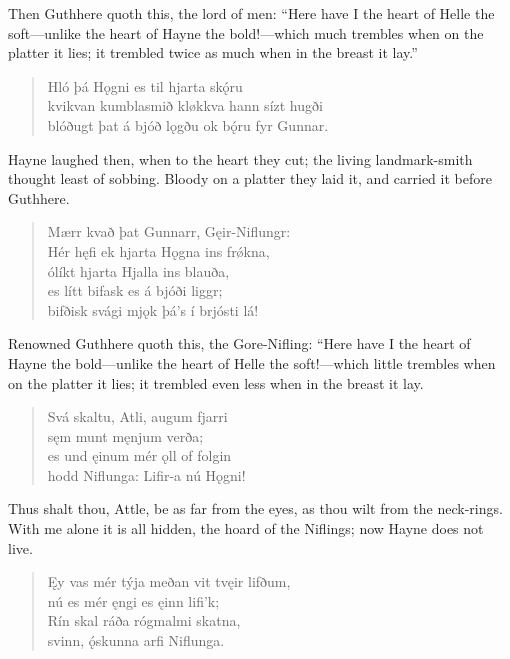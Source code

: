 \bvb Then Guthhere quoth this, the lord of men: “Here have I the heart of Helle the soft—unlike the heart of Hayne the bold!—which much trembles when on the platter it lies; it trembled twice as much when in the breast it lay.”

\begin{verse}
\bva Hló þá Hǫgni \hld es til hjarta skǫ́ru \\%
kvikvan kumblasmið \hld kløkkva hann sízt hugði \\%
blóðugt þat á bjóð lǫgðu \hld ok bǫ́ru fyr Gunnar.\\%
\end{verse}

\bvb Hayne laughed then, when to the heart they cut; the living landmark-smith thought least of sobbing. Bloody on a platter they laid it, and carried it before Guthhere.

\begin{verse}
\bva Mærr kvað þat Gunnarr, \hld Gęir-Niflungr: \\%
Hér hęfi ek hjarta \hld Hǫgna ins frǿkna, \\%
ólíkt hjarta \hld Hjalla ins blauða, \\%
es lítt bifask \hld es á bjóði liggr; \\%
bifðisk svági mjǫk \hld þá’s í brjósti lá!\\%
\end{verse}

\bvb Renowned Guthhere quoth this, the Gore-Nifling: “Here have I the heart of Hayne the bold—unlike the heart of Helle the soft!—which little trembles when on the platter it lies; it trembled even less when in the breast it lay.

\begin{verse}
\bva Svá skaltu, Atli, \hld augum fjarri \\%
sęm munt \hld męnjum verða; \\%
es und ęinum mér \hld ǫll of folgin \\%
hodd Niflunga: \hld Lifir-a nú Hǫgni!\\%
\end{verse}

\bvb Thus shalt thou, Attle, be as far from the eyes, as thou wilt from the neck-rings. With me alone it is all hidden, the hoard of the Niflings; now Hayne does not live.

\begin{verse}
\bva Ęy vas mér týja \hld  meðan vit tvęir lifðum, \\%
nú es mér ęngi \hld es ęinn lifi’k; \\%
Rín skal ráða \hld rógmalmi skatna, \\%
svinn, ǫ́skunna \hld arfi Niflunga.\\%
\end{verse}

